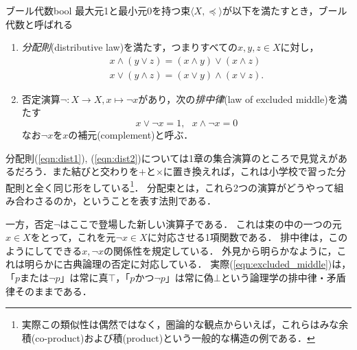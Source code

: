 \documentclass[11pt,a4paper, dvipdfmx]{jsarticle}
\begin{document}
\begin{dfn}{ブール代数}{bool}
    最大元1と最小元0を持つ束$\langle X, \preceq \rangle$が以下を満たすとき，ブール代数と呼ばれる
    \begin{enumerate}
        \item \emph{分配則}(distributive law)を満たす，つまりすべての$x, y, z \in X$に対し，
        \begin{align}
         x \wedge (y \vee z) = (x \wedge y) \vee (x \wedge z) \label{eqn:dist1}\\
         x \vee (y \wedge z) = (x \vee y) \wedge (x \vee z) . \label{eqn:dist2}
        \end{align}
        \item 否定演算$\neg: X \to X, x \mapsto \neg x$があり，次の\emph{排中律}(law of excluded middle)を満たす
        \begin{equation}
            x \vee \neg x = 1, \ \ \ x \wedge \neg x = 0
           \label{eqn:excluded_middle}
        \end{equation}
        なお$\neg x$を$x$の補元(complement)と呼ぶ．
    \end{enumerate}   
\end{dfn}

分配則(\ref{eqn:dist1}), (\ref{eqn:dist2})については1章の集合演算のところで見覚えがあるだろう．また結びと交わりを$+$と$\times$に置き換えれば，これは小学校で習った分配則と全く同じ形をしている\footnote{実際この類似性は偶然ではなく，圏論的な観点からいえば，これらはみな余積(co-product)および積(product)という一般的な構造の例である．}．
分配束とは，これら2つの演算がどうやって組み合わさるのか，ということを表す法則である．

一方，否定$\neg$はここで登場した新しい演算子である．
これは束の中の一つの元$x \in X$をとって，これを元$\neg x \in X$に対応させる1項関数である．
排中律は，このようにしてできる$x, \neg x$の関係性を規定している．
外見から明らかなように，これは明らかに古典論理の否定に対応している．
実際(\ref{eqn:excluded_middle})は，「$p$または$\neg p$」は常に真$\top$，「$p$かつ$\neg p$」は常に偽$\bot$という論理学の排中律・矛盾律そのままである．

\end{document}
